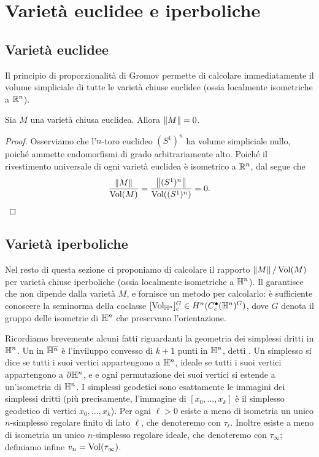\section{Varietà euclidee e iperboliche}

\subsection{Varietà euclidee}

Il principio di proporzionalità di Gromov permette di calcolare immediatamente il volume simpliciale di tutte le varietà chiuse euclidee (ossia localmente isometriche a $\mathbb{R}^n$).

\begin{proposition}
Sia $M$ una varietà chiusa euclidea. Allora $\left\lVert M\right\rVert=0$.
\end{proposition}
\begin{proof}
Osserviamo che l'$n$-toro euclideo $(S^1)^n$ ha volume simpliciale nullo, poiché ammette endomorfismi di grado arbitrariamente alto. Poiché il rivestimento universale di ogni varietà euclidea è isometrico a $\mathbb{R}^n$, dal  segue che
\[
\frac{\left\lVert M\right\rVert}{\operatorname{Vol}(M)}=\frac{\left\lVert (S^1)^n\right\rVert}{\operatorname{Vol}((S^1)^n)}=0.\qedhere
\]
\end{proof}

\subsection{Varietà iperboliche}
Nel resto di questa sezione ci proponiamo di calcolare il rapporto $\left\lVert M\right\rVert/\operatorname{Vol}(M)$ per varietà chiuse iperboliche (ossia localmente isometriche a $\mathbb{H}^n$). Il  garantisce che non dipende dalla varietà $M$, e fornisce un metodo per calcolarlo: è sufficiente conoscere la seminorma della coclasse $[\operatorname{Vol}_{\mathbb{H}^n}]^G_c\in H^n(C^\bullet_c(\mathbb{H}^n)^G)$, dove $G$ denota il gruppo delle isometrie di $\mathbb{H}^n$ che preservano l'orientazione.

Ricordiamo brevemente alcuni fatti riguardanti la geometria dei simplessi dritti in $\mathbb{H}^n$. Un  in $\overline{\mathbb{H}^n}$ è l'inviluppo convesso di $k+1$ punti in $\mathbb{H}^n$, detti . Un simplesso si dice  se tutti i suoi vertici appartengono a $\mathbb{H}^n$, ideale se tutti i suoi vertici appartengono a $\partial\mathbb{H}^n$, e  e ogni permutazione dei suoi vertici si estende a un'isometria di $\mathbb{H}^n$. I simplessi geodetici sono esattamente le immagini dei simplessi dritti (più precisamente, l'immagine di $[x_0,\ldots,x_k]$ è il simplesso geodetico di vertici $x_0,\ldots,x_k$). Per ogni $\ell>0$ esiste a meno di isometria un unico $n$-simplesso regolare finito di lato $\ell$, che denoteremo con $\tau_\ell$. Inoltre esiste a meno di isometria un unico $n$-simplesso regolare ideale, che denoteremo con $\tau_\infty$; definiamo infine $v_n=\operatorname{Vol}(\tau_\infty)$.

